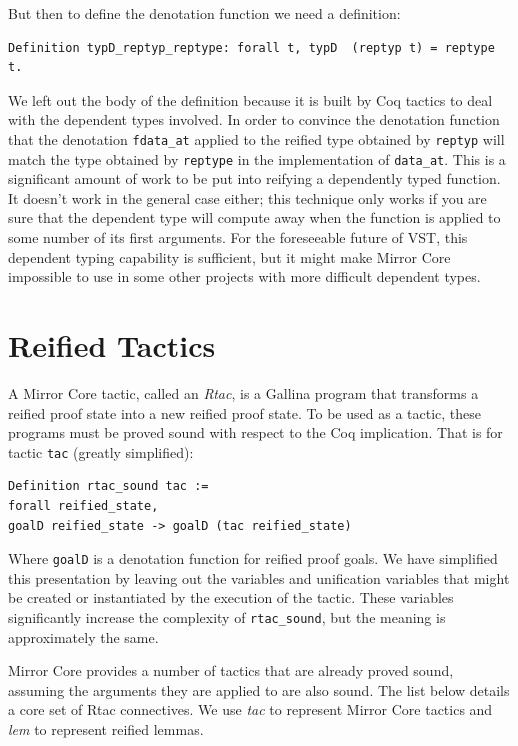 \documentclass{puthesis}
\begin{document}
But then to define the denotation function we need a definition:

\begin{lstlisting}
Definition typD_reptyp_reptype: forall t, typD  (reptyp t) = reptype t.
\end{lstlisting}

We left out the body of the definition because it is built by Coq
tactics to deal with the dependent types involved.
In order to convince the denotation function that the denotation
\lstinline|fdata_at| applied to the reified type obtained by
\lstinline|reptyp| will match the type obtained by \lstinline|reptype|
in the implementation of \lstinline|data_at|. This is a significant
amount of work to be put into reifying a dependently typed
function. It doesn't work in the general case either; this technique
only works if you are sure that the dependent type will compute away
when the function is applied to some number of its first
arguments. For the foreseeable future of VST, this dependent typing
capability is sufficient, but it might make Mirror Core impossible to
use in some other projects with more difficult dependent types.

\section{Reified Tactics}

A Mirror Core tactic, called an \emph{Rtac}, is a Gallina program that transforms
a reified proof state into a new reified proof state. To be used as a
tactic, these programs must be proved sound with respect to the Coq
implication. That is for tactic \lstinline|tac| (greatly simplified):

\begin{lstlisting}
Definition rtac_sound tac := 
forall reified_state,
goalD reified_state -> goalD (tac reified_state)
\end{lstlisting}

Where \lstinline|goalD| is a denotation function for reified proof
goals. We have simplified this presentation by leaving out the variables
and unification variables that might be created or instantiated by the
execution of the tactic. These variables significantly increase the
complexity of \lstinline|rtac_sound|, but the meaning is approximately the same.

Mirror Core provides a number of tactics that are already proved
sound, assuming the arguments they are applied to are also sound.  The
list below details a core set of Rtac connectives. We use {\it tac} to
represent Mirror Core tactics and {\it lem} to represent reified
lemmas.
\end{document}
